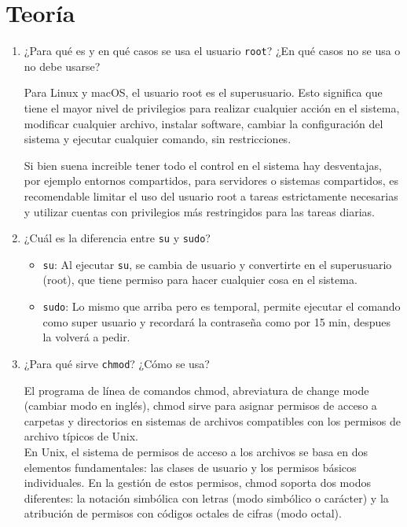 \section*{Teoría}

\begin{enumerate}
    \item ¿Para qué es y en qué casos se usa el usuario \texttt{root}? ¿En qué casos no se usa o no debe usarse?
    
    Para Linux y macOS, el usuario root es el superusuario. Esto significa que tiene el mayor nivel de privilegios para 
    realizar cualquier acción en el sistema, modificar cualquier archivo, instalar software, cambiar la configuración 
    del sistema y ejecutar cualquier comando, sin restricciones.

    Si bien suena increible tener todo el control en el sistema hay desventajas, por ejemplo entornos compartidos, 
    para servidores o sistemas compartidos, es recomendable limitar el uso del usuario root a tareas estrictamente 
    necesarias y utilizar cuentas con privilegios más restringidos para las tareas diarias. \cite*{UserRoot}

    
    \item ¿Cuál es la diferencia entre \texttt{su} y \texttt{sudo}? \cite*{RootSU}
    
    \begin{itemize}
        \item \texttt{su}: Al ejecutar \texttt{su}, se cambia de usuario y convertirte en 
        el superusuario (root), que tiene permiso para hacer cualquier cosa en el sistema.

        \item \texttt{sudo}: Lo mismo que arriba pero es temporal, permite ejecutar el comando como 
        super usuario y recordará la contraseña como por 15 min, despues la volverá a pedir.
    \end{itemize}
    
    \item ¿Para qué sirve \texttt{chmod}? ¿Cómo se usa?
    
    El programa de línea de comandos chmod, abreviatura de change mode (cambiar modo en inglés), 
    chmod sirve para asignar permisos de acceso a carpetas y directorios en sistemas de archivos 
    compatibles con los permisos de archivo típicos de Unix.\\

    En Unix, el sistema de permisos de acceso a los archivos se basa en dos elementos fundamentales: 
    las clases de usuario y los permisos básicos individuales. En la gestión de estos permisos, 
    chmod soporta dos modos diferentes: la notación simbólica con letras (modo simbólico o carácter) 
    y la atribución de permisos con códigos octales de cifras (modo octal).



\end{enumerate}
